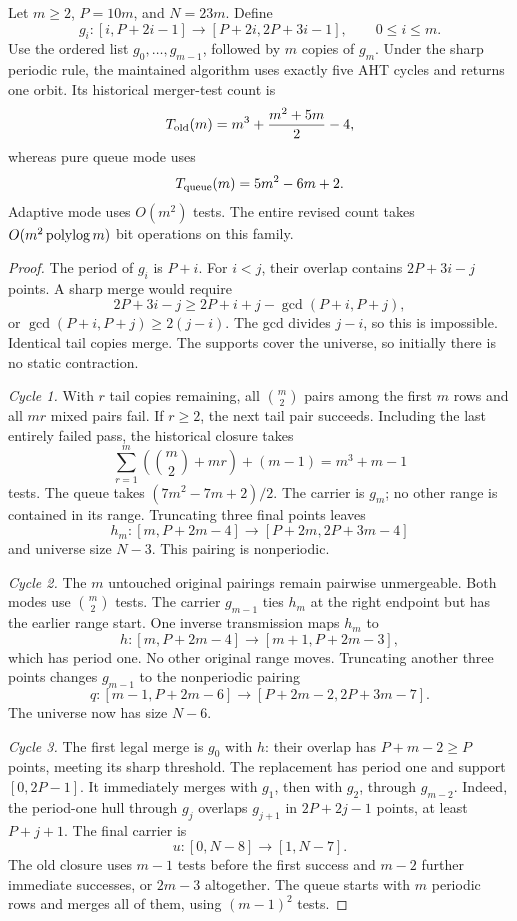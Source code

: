 \begin{theorem}
\label{thm:five-cycle}
Let \(m\ge2\), \(P=10m\), and \(N=23m\). Define
\[
 g_i:[i,P+2i-1]\longrightarrow[P+2i,2P+3i-1],
 \qquad 0\le i\le m.
\]
Use the ordered list \(g_0,\ldots,g_{m-1}\), followed by \(m\) copies
of \(g_m\). Under the sharp periodic rule, the maintained algorithm
uses exactly five AHT cycles and returns one orbit.
Its historical merger-test count is
\[
 T_{\rm old}(m)=m^3+\frac{m^2+5m}{2}-4,
\]
whereas pure queue mode uses
\[
 T_{\rm queue}(m)=5m^2-6m+2.
\]
Adaptive mode uses \(O(m^2)\) tests. The entire revised count takes
\(O(m^2\operatorname{polylog} m)\) bit operations on this family.
\end{theorem}
\begin{proof}
The period of \(g_i\) is \(P+i\). For \(i<j\), their overlap contains
\(2P+3i-j\) points. A sharp merge would require
\[
 2P+3i-j\ge2P+i+j-\gcd(P+i,P+j),
\]
or \(\gcd(P+i,P+j)\ge2(j-i)\). The gcd divides \(j-i\), so this is
impossible. Identical tail copies merge. The supports cover the universe,
so initially there is no static contraction.

\emph{Cycle 1.}
With \(r\) tail copies remaining, all \(\binom m2\) pairs among the first
\(m\) rows and all \(mr\) mixed pairs fail. If \(r\ge2\), the next tail
pair succeeds. Including the last entirely failed pass, the historical
closure takes
\[
 \sum_{r=1}^{m}\left(\binom m2+mr\right)+(m-1)
 =m^3+m-1
\]
tests. The queue takes \((7m^2-7m+2)/2\).
The carrier is \(g_m\); no other range is contained in its range.
Truncating three final points leaves
\[
 h_m:[m,P+2m-4]\longrightarrow[P+2m,2P+3m-4]
\]
and universe size \(N-3\). This pairing is nonperiodic.

\emph{Cycle 2.}
The \(m\) untouched original pairings remain pairwise unmergeable.
Both modes use \(\binom m2\) tests. The carrier
\(g_{m-1}\) ties \(h_m\) at the right endpoint but has the earlier range
start. One inverse transmission maps \(h_m\) to
\[
 h:[m,P+2m-4]\longrightarrow[m+1,P+2m-3],
\]
which has period one. No other original range moves. Truncating another
three points changes \(g_{m-1}\) to the nonperiodic pairing
\[
 q:[m-1,P+2m-6]\longrightarrow[P+2m-2,2P+3m-7].
\]
The universe now has size \(N-6\).

\emph{Cycle 3.}
The first legal merge is \(g_0\) with \(h\): their overlap has
\(P+m-2\ge P\) points, meeting its sharp threshold. The replacement
has period one and support \([0,2P-1]\). It immediately merges with
\(g_1\), then with \(g_2\), through \(g_{m-2}\). Indeed, the
period-one hull through \(g_j\) overlaps \(g_{j+1}\) in
\(2P+2j-1\) points, at least \(P+j+1\). The final carrier is
\[
 u:[0,N-8]\longrightarrow[1,N-7].
\]
The old closure uses \(m-1\) tests before the first success and \(m-2\)
further immediate successes, or \(2m-3\) altogether. The queue starts
with \(m\) periodic rows and merges all of them, using \((m-1)^2\) tests.


\end{proof}
